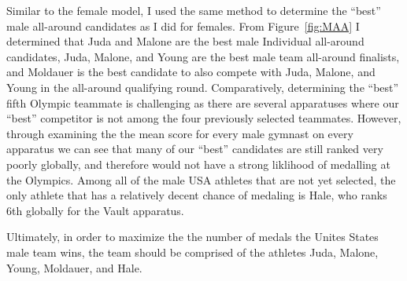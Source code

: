 \documentclass[12pt]{article}
\begin{document}
Similar to the female model, I used the same method to determine the ``best'' male all-around candidates as I did for females. From 
Figure~\ref{fig:MAA} I determined that Juda and Malone are the best male Individual all-around candidates, 
Juda, Malone, and Young are the best male team all-around finalists, and Moldauer is the best candidate to also compete 
with Juda, Malone, and Young in the all-around qualifying round. Comparatively, determining the ``best'' fifth Olympic 
teammate is challenging as there are several apparatuses where our ``best'' competitor is not among the four 
previously selected teammates. However, through examining the the mean score for every male gymnast on every apparatus 
we can see that many of our ``best'' candidates are still ranked very poorly globally, and therefore would not have a 
strong liklihood of medalling at the Olympics. Among all of the male USA athletes that are not yet selected, the only 
athlete that has a relatively decent chance of medaling is Hale, who ranks 6th globally for the Vault apparatus.

Ultimately, in order to maximize the the number of medals the Unites States male team wins, the team should be comprised  
of the athletes Juda, Malone, Young, Moldauer, and Hale.



\end{document}
